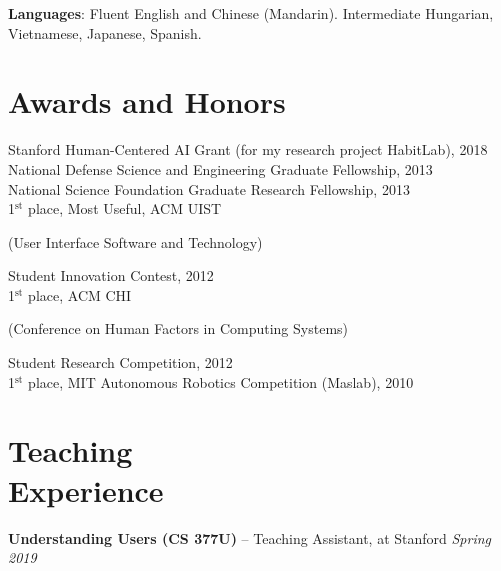 \documentclass[margin,line]{resume}
\begin{document}
\begin{resume}
\vspace{-4mm}


\textbf{Languages}: Fluent English and Chinese (Mandarin). Intermediate Hungarian, Vietnamese, Japanese, Spanish.

\pagebreak

\section{\mysidestyle Awards and Honors}

Stanford Human-Centered AI Grant (for my research project HabitLab), 2018\\ %
National Defense Science and Engineering Graduate Fellowship, 2013\\ %
National Science Foundation Graduate Research Fellowship, 2013\\ %
1$^{\textrm{st}}$ place, Most Useful, ACM UIST \begin{small}(User Interface Software and Technology)\end{small} Student Innovation Contest, 2012\\
1$^{\textrm{st}}$ place, ACM CHI \begin{small}(Conference on Human Factors in Computing Systems)\end{small} Student Research Competition, 2012\\
1$^{\textrm{st}}$ place, MIT Autonomous Robotics Competition (Maslab), 2010

\section{\mysidestyle Teaching\\Experience}

\textbf{Understanding Users (CS 377U)} -- Teaching Assistant, at Stanford \hfill \textsl{Spring 2019} \\


\end{resume}
\end{document}

